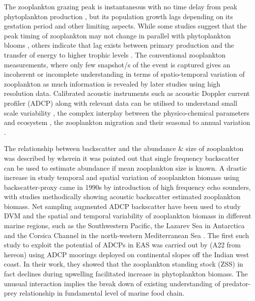 \documentclass{article}
\begin{document}
	The zooplankton grazing peak is instantaneous with no time delay from peak phytoplankton production \citep{li2000determines,barber2001qn}, but its population growth lags \citep{rehim2012dynamical, almen2020temperature} depending on its gestation period and other limiting aspects. While some studies suggest that the peak timing of zooplankton may not change in parallel with phytoplankton blooms \citep{winder2004climatic}, others indicate that lag exists between primary production and the transfer of energy to higher trophic levels \citep{brock1992interannual, brock1991phytoplankton}. The conventional zooplankton measurements, where only few snapshot/s of the event is captured gives an incoherent or incomplete understanding in terms of spatio-temporal variation of zooplankton \citep{ramamurthy1965studies, piontkovski1995spatial, madhupratap1992zooplankton,madhupratap1996lack,wishner1998mesozooplankton,kidwai2000dd,barber2001qn,khandagale2022seasonal} as much information is revealed by later studies \citep{jyothibabu2010re, vijith2016consequences, shankar2019role, aparna2022seasonal} using high resolution data. Calibrated acoustic instruments such as acoustic Doppler current profiler (ADCP) along with relevant data can be utilised to understand small scale variability \citep{nair1999arabian, edvardsen2003assessing, smith2005mesozooplankton, smeti2015spatial, kang2024acoustic}, the complex interplay between the physico-chemical parameters and ecosystem \citep{jiang2007temporal, potiris2018acoustic, shankar2019role, aparna2022seasonal, nie2023influence}, the zooplankton migration \citep{inoue2016diel,ursella2018evidence, ursella2021diel} and their seasonal to annual variation \citep{jiang2007temporal, hobbs2021marine,liu2022seasonal, aparna2022seasonal}.
	
    The relationship between backscatter and the abundance \& size of zooplankton was described by \citet{greenlaw1979acoustical} wherein it was pointed out that single frequency backscatter can be used to estimate abundance if mean zooplankton size is known. A drastic increase in study temporal and spatial variation of zooplankton biomass using  backscatter-proxy came in 1990s by introduction of high frequency echo sounders, with studies \citep{flagg1989use, wiebe1990sound, batchelder00981, greene1998three, rippeth1998diur} methodically showing acoustic backscatter estimated zooplankton biomass.
	Net sampling augmented ADCP backscatter have been used to study DVM and the spatial and temporal variability of zooplankton biomass in different marine regions, such as the Southwestern Pacific, the Lazarev Sea in Antarctica and the Corsica Channel in the north-western Mediterranean Sea \citep{cisewski2010seasonal,hamilton2013links, smeti2015spatial, guerra2019zooplankton}. The first such study to exploit the potential of ADCPs in EAS was carried out by \citet{aparna2022seasonal} (A22 from hereon) using ADCP moorings deployed on continental slopes off the Indian west coast.	In their work, they showed that the zooplankton standing stock (ZSS) in fact declines during upwelling facilitated increase in phytoplankton biomass. The unusual interaction implies the break down of existing understanding of predator-prey relationship in fundamental level of marine food chain.
	
\end{document}
